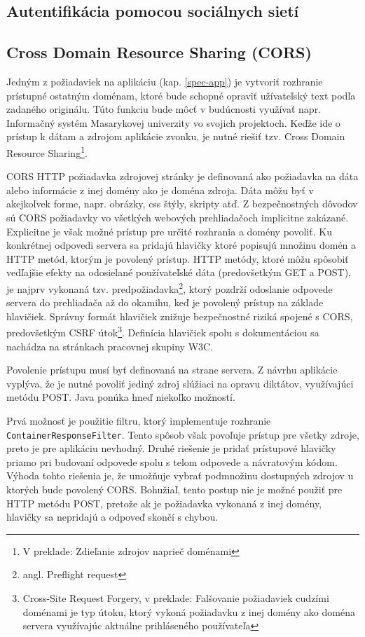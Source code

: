 \documentclass[12pt,oneside]{fithesis2}
\begin{document}
      		\subsection{Autentifikácia pomocou sociálnych sietí}
      		\par 
      		
      		\subsection{Cross Domain Resource Sharing (CORS)}
      		\par Jedným z požiadaviek na aplikáciu (kap. \ref{spec-app}) je vytvoriť rozhranie prístupné ostatným doménam, ktoré bude schopné opraviť užívateľský text podľa zadaného originálu. Túto funkciu bude môcť v budúcnosti využívať napr. Informačný systém Masarykovej univerzity vo svojich projektoch. Keďže ide o prístup k dátam a zdrojom aplikácie zvonku, je nutné riešiť tzv. Cross Domain Resource Sharing\footnote{V preklade: Zdieľanie zdrojov naprieč doménami}.
      		\par CORS HTTP požiadavka zdrojovej stránky je definovaná ako požiadavka na dáta alebo informácie z inej domény ako je doména zdroja. Dáta môžu byť v akejkoľvek forme, napr. obrázky, css štýly, skripty atď. Z bezpečnostných dôvodov sú CORS požiadavky vo všetkých webových prehliadačoch implicitne zakázané. Explicitne je však možné prístup pre určité rozhrania a domény povoliť. Ku konkrétnej odpovedi servera sa pridajú hlavičky ktoré popisujú množinu domén a HTTP metód, ktorým je povolený prístup. HTTP metódy, ktoré môžu spôsobiť vedľajšie efekty na odosielané používateľské dáta (predovšetkým GET a POST), je najprv vykonaná tzv. predpožiadavka\footnote{angl. Preflight request}, ktorý pozdrží odoslanie odpovede servera do prehliadača až do okamihu, keď je povolený prístup na základe hlavičiek\cite{mozilla2015}. Správny formát hlavičiek znižuje bezpečnostné riziká spojené s CORS, predovšetkým CSRF útok\footnote{Cross-Site Request Forgery, v preklade: Falšovanie požiadaviek cudzími doménami je typ útoku, ktorý vykoná požiadavku z inej domény ako doména servera využívajúc aktuálne prihláseného používateľa}\cite{sof4}. Definícia hlavičiek spolu s dokumentáciou sa nachádza na stránkach pracovnej skupiny W3C\cite{w3c2014}.
      		\par Povolenie prístupu musí byť definovaná na strane servera. Z návrhu aplikácie vyplýva, že je nutné povoliť jediný zdroj slúžiaci na opravu diktátov, využívajúci metódu POST. Java ponúka hneď niekoľko možností.
      		\par Prvá možnosť je použitie filtru, ktorý implementuje rozhranie \texttt{ContainerResponseFilter}\cite{matei14}\cite{sof3}. Tento spôsob však povoľuje prístup pre všetky zdroje, preto je pre aplikáciu nevhodný. Druhé riešenie je pridať prístupové hlavičky priamo pri budovaní odpovede spolu s telom odpovede a návratovým kódom. Výhoda tohto riešenia je, že umožňuje vybrať podmnožinu dostupných zdrojov u ktorých bude povolený CORS. Bohužiaľ, tento postup nie je možné použiť pre HTTP metódu POST, pretože ak je požiadavka vykonaná z inej domény, hlavičky sa nepridajú a odpoveď skončí s chybou\cite{sof2}. 
\end{document}
